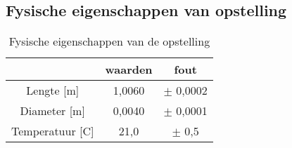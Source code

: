 \subsection{Fysische eigenschappen van opstelling}


\begin{table}[h]
    \centering
    \caption{Fysische eigenschappen van de opstelling}
    \begin{tabular}{| c | c | c |}
        \hline
                        & waarden   & fout       \\ \hline
        Lengte [m]      & 1,0060    & $\pm$ 0,0002 \\ \hline
        Diameter [m]    & 0,0040    & $\pm$ 0,0001 \\ \hline
        Temperatuur [C] & 21,0      & $\pm$ 0,5    \\ \hline
        
    \end{tabular}
\end{table}


